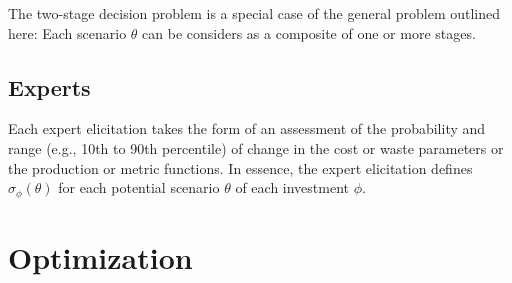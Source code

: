 \documentclass[letterpaper,10pt,english]{sphinxmanual}
\begin{document}
The two-stage decision problem is a special case of the general problem
outlined here: Each scenario \(\theta\) can be considers as a
composite of one or more stages.


\section{Experts}
\label{\detokenize{formulation:experts}}
Each expert elicitation takes the form of an assessment of the
probability and range (e.g., 10th to 90th percentile) of change in the
cost or waste parameters or the production or metric functions. In
essence, the expert elicitation defines \(\sigma_\phi(\theta)\) for
each potential scenario \(\theta\) of each investment \(\phi\).


\chapter{Optimization}
\label{\detokenize{optimizers:optimization}}\label{\detokenize{optimizers:sec-optimizers}}\label{\detokenize{optimizers::doc}}
\end{document}
